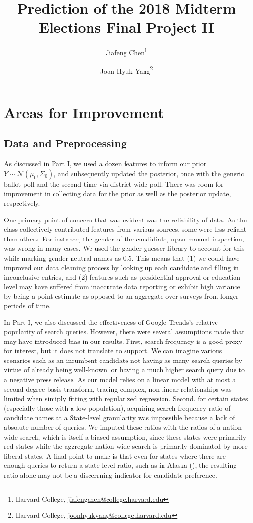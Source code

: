 \documentclass[12pt, letterpaper]{article}
\title{\sffamily\bfseries{Prediction of the 2018 Midterm Elections Final Project II}}
\author{Jiafeng Chen\thanks{Harvard College, \url{jiafengchen@college.harvard.edu}} \and Joon Hyuk Yang\thanks{Harvard College, \url{joonhyukyang@college.harvard.edu}}}
\begin{document}
\maketitle

\section{Areas for Improvement}
\label{sec:model}

\subsection{Data and Preprocessing}
As discussed in Part I, we used a dozen features to inform our prior $Y \sim \mathcal{N}(\mu_0, \Sigma_0)$, and subsequently updated the posterior, once with the generic ballot poll and the second time via district-wide poll. There was room for improvement in collecting data for the prior as well as the posterior update, respectively.

One primary point of concern that was evident was the reliability of data. As the class collectively contributed features from various sources, some were less reliant than others. For instance, the gender of the candidiate, upon manual inspection, was wrong in many cases. We used the gender-guesser library to account for this while marking gender neutral names as 0.5. This means that (1) we could have improved our data cleaning process by looking up each candidate and filling in inconclusive entries, and (2) features such as presidential approval or education level may have suffered from inaccurate data reporting or exhibit high variance by being a point estimate as opposed to an aggregate over surveys from longer periods of time.

In Part I, we also discussed the effectiveness of Google Trends's relative popularity of search queries. However, there were several assumptions made that may have introduced bias in our results. First, search frequency is a good proxy for interest, but it does not translate to support. We can imagine various scenarios such as an incumbent candidate not having as many search queries by virtue of already being well-known, or having a much higher search query due to a negative press release. As our model relies on a linear model with at most a second degree basis transform, tracing complex, non-linear relationships was limited when simiply fitting with regularized regression. Second, for certain states (especially those with a low population), acquiring search frequency ratio of candidate names at a State-level granularity was impossible because a lack of absolute number of queries. We imputed these ratios with the ratios of a nation-wide search, which is itself a biased assumption, since these states were primarily red states while the aggregate nation-wide search is primarily dominated by more liberal states. A final point to make is that even for states where there are enough queries to return a state-level ratio, such as in Alaska (), the resulting ratio alone may not be a discerrning indicator for candidate preference.
\end{document}
